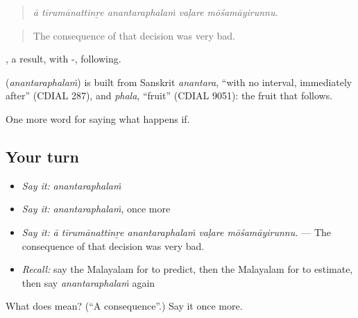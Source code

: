 \begin{quote}
\emph{ā tīrumānattinṟe anantaraphalaṁ vaḷare mōśamāyirunnu.}
\end{quote}

\begin{quote}
The consequence of that decision was very bad.
\end{quote}

, a result, with -, following.

\begin{cousinweb}
\textbf{} (\emph{anantaraphalaṁ}) is built from Sanskrit \emph{anantara}, \textquotedblleft{}with no interval, immediately after\textquotedblright{} (CDIAL 287), and \emph{phala}, \textquotedblleft{}fruit\textquotedblright{} (CDIAL 9051): the fruit that follows.
\end{cousinweb}

\begin{grammarlens}[title={What you've built}]
One more word for saying what happens if.
\end{grammarlens}

\subsection*{Your turn}
\begin{itemize}
\raggedright
  \item \emph{Say it:} \emph{anantaraphalaṁ}
  \item \emph{Say it:} \emph{anantaraphalaṁ}, once more
  \item \emph{Say it:} \emph{ā tīrumānattinṟe anantaraphalaṁ vaḷare mōśamāyirunnu.} — The consequence of that decision was very bad.
  \item \emph{Recall:} say the Malayalam for to predict, then the Malayalam for to estimate, then say \emph{anantaraphalaṁ} again
\end{itemize}

\begin{tcolorbox}[breakable,colback=teal!4,colframe=teal!35!black,title={Before you move on}]
What does  mean? (\textquotedblleft{}A consequence\textquotedblright{}.) Say it once more.
\end{tcolorbox}
